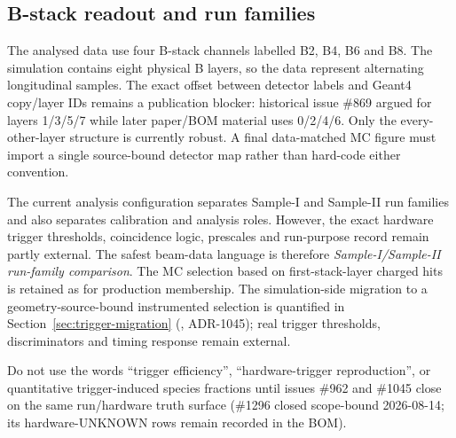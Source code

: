 \subsection{B-stack readout and run families}

The analysed data use four B-stack channels labelled B2, B4, B6 and B8. The simulation contains eight physical B layers, so the data represent alternating longitudinal samples. The exact offset between detector labels and Geant4 copy/layer IDs remains a publication blocker: historical issue \#869 argued for layers 1/3/5/7 while later paper/BOM material uses 0/2/4/6. Only the every-other-layer structure is currently robust. A final data-matched MC figure must import a single source-bound detector map rather than hard-code either convention.


The current analysis configuration separates Sample-I and Sample-II run families and also separates calibration and analysis roles. However, the exact hardware trigger thresholds, coincidence logic, prescales and run-purpose record remain partly external. The safest beam-data language is therefore \emph{Sample-I/Sample-II run-family comparison}. The MC selection based on first-stack-layer charged hits is retained as  for production membership. The simulation-side migration to a geometry-source-bound instrumented selection is quantified in Section~\ref{sec:trigger-migration} (, ADR-1045); real trigger thresholds, discriminators and timing response remain external.

\begin{publicationhold}
Do not use the words ``trigger efficiency'', ``hardware-trigger reproduction'', or quantitative trigger-induced species fractions until issues \#962 and \#1045 close on the same run/hardware truth surface (\#1296 closed scope-bound 2026-08-14; its hardware-UNKNOWN rows remain recorded in the BOM).
\end{publicationhold}
